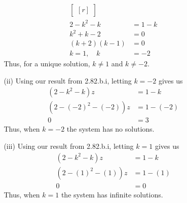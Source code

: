 \documentclass[12pt]{article}
\begin{document}
\begin{enumerate}
\begin{enumerate}
\begin{enumerate}
\begin{align*}
\begin{bmatrix}[r]
		\end{bmatrix}\\
		2-k^2-k &=1-k\\
		k^2+k-2 &= 0\\
		(k+2)(k-1) &=0\\
		k=1, \quad k&=-2
		\end{align*}	
		Thus, for a unique solution, $k \neq 1$ and $k \neq -2$.\\
		\item [(ii)]
		Using our result from 2.82.b.i, letting $k=-2$ gives us
		\begin{align*}
		(2-k^2-k)z &= 1-k\\
		(2-(-2)^2-(-2))z &= 1-(-2)\\
		0 &= 3
		\end{align*}
		Thus, when $k=-2$ the system has no solutions.\\

		\pagebreak
		\item [(iii)]
		Using our result from 2.82.b.i, letting $k = 1$ gives us
		\begin{align*}
		(2-k^2-k)z &= 1-k\\
		(2-(1)^2-(1))z &= 1-(1)\\
		0 &= 0
		\end{align*}
		Thus, when $k=1$ the system has infinite solutions.\\
		

\end{enumerate}
\end{enumerate}
\end{enumerate}
\end{document}
